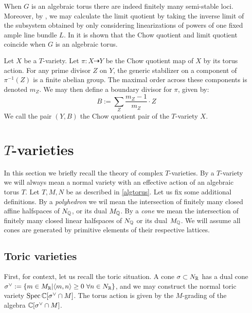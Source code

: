 When \(G\) is an algebraic torus there are indeed finitely many semi-stable loci. Moreover, by \cite[Corollary 2.7]{baker2012}, we may calculate the limit quotient by taking the inverse limit of the subsystem obtained by only considering linearizations of powers of one fixed ample line bundle \(L\).
%
%
%
In \cite[Proposition 2.5]{baker2012} it is shown that the Chow quotient and limit quotient coincide when \(G\) is an algebraic torus.
\begin{definition}
Let \(X\) be a \(T\)-variety. Let \(\pi:X \dashrightarrow Y\) be the Chow quotient map of \(X\) by its torus action. For any prime divisor \(Z\) on \(Y\), the generic stabilizer on a component of \(\pi^{-1}(Z)\) is a finite abelian group. The maximal order across these components is denoted \(m_Z\). We may then define a boundary divisor for \(\pi\), given by:
\begin{equation} \label{boundary}
B := \sum_Z \frac{m_Z-1}{m_Z} \cdot Z
\end{equation}
We call the pair \((Y,B)\) the Chow quotient pair of the \(T\)-variety \(X\).
\end{definition}
\section{$T$-varieties} \label{prelim:Tvar}
In this section we briefly recall the theory of complex \(T\)-varieties. By a \(T\)-variety we will always mean a normal variety with an effective action of an algebraic torus \(T\). Let \(T,M,N\) be as described in \ref{algtorus}. Let us fix some additional definitions. By a \textit{polyhedron} we wil mean the intersection of finitely many closed affine halfspaces of \(N_{\mathbb{Q}}\), or its dual \(M_{\mathbb{Q}}\). By a \textit{cone} we mean the intersection of finitely many closed linear halfspaces of \(N_{\mathbb{Q}}\) or its dual \(M_{\mathbb{Q}}\). We will assume all cones are generated by primitive elements of their respective lattices.
\subsection{Toric varieties}
First, for context, let us recall the toric situation. A cone \(\sigma \subset N_{\mathbb{R}}\) has a dual cone \(\sigma^\vee := \{m \in M_{\mathbb{R}} | \langle m, n \rangle \ge 0 \ \forall n \in N_{\mathbb{R}}\}\), and we may construct the normal toric variety \(\operatorname{Spec} \mathbb{C}[\sigma^\vee \cap M]\). The torus action is given by the \(M\)-grading of the algebra \(\mathbb{C}[\sigma^\vee \cap M]\). 

